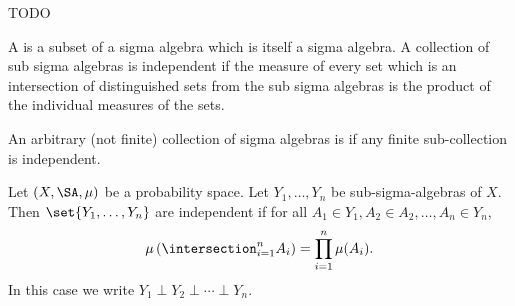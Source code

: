 
\sbasic



\sstart



TODO


A 
is a subset of a sigma algebra
which is itself a sigma algebra.
A collection of sub sigma algebras
is independent if the measure
of every set which is an intersection
of distinguished sets from the
sub sigma algebras
is the product
of the individual measures of the sets.

An arbitrary (not finite)
collection of sigma algebras
is 
if any finite sub-collection is independent.



Let $(X, \SA, \mu)$ be a probability
space.
Let $Y_1, \dots, Y_n$ be
sub-sigma-algebras of $X$.
Then $\set{Y_1, \dots, Y_n}$
are independent if for all
$A_1 \in Y_1, A_2 \in A_2, \dots, A_n \in Y_n$,
\[
  \mu\left(\intersection_{i = 1}^{n}A_i\right) = \prod_{i = 1}^{n} \mu(A_i).
\]
In this case we write $Y_1 \perp Y_2 \perp \cdots \perp Y_n$.

\strats
